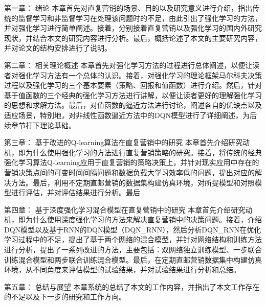 第一章： 绪论 \quad 本章首先对直复营销的场景、目的以及研究意义进行介绍，指出传统的监督学习和非监督学习在处理该问题时的不足，由此引出了强化学习的方法，并对强化学习进行简单阐述。接着，分别接着直复营销以及强化学习的国内外研究现状，并结合本文的研究内容进行分析。最后，概括论述了本文的主要研究内容，并对论文的结构安排进行了说明。

第二章： 相关理论概述 \quad 本章首先对强化学习方法的过程进行总体阐述，以便让读者对强化学习方法有一个总体的认识。接着，对强化学习的理论框架马尔科夫决策过程以及强化学习的三个基本要素（策略、回报和值函数）进行介绍。然后，针对基于值函数的三个经典的强化学习方法进行讲解，以便让读者更好的理解强化学习的思想和求解方法。最后，对值函数的逼近方法进行讨论，阐述各自的优缺点以及适应场景，特别地，对非线性函数逼近方法中的DQN模型进行了详细阐述，为后续章节打下理论基础。

第三章： 基于改进的Q-learning算法在直复营销中的研究 \quad 本章首先介绍研究动机，即为什么使用强化学习的方法进行直复营销策略的研究。接着，将传统的经典强化学习算法Q-learning应用于直复营销的策略决策上，并针对现实应用中存在的营销决策点间的可变时间间隔问题和数据负载大学习效率低的问题，提出对应的解决方法。最后，利用不定期直邮营销的数据集构建仿真环境，对所提模型和对照模型进行评估，并对评估结果进行分析。最后

第四章： 基于深度强化学习混合模型在直复营销中的研究 \quad 本章首先介绍研究动机，即为什么使用深度强化学习的方法来解决直复营销中的决策问题。接着，介绍DQN模型以及基于RNN的DQN模型（DQN_RNN），然后分析DQN_RNN在优化学习过程中的不足，提出了基于两个网络的混合模型，并针对网络结构和训练方法进行分析，提出了一系列改进的方法，主要包括：双网络独立训练模型、一步联合训练混合模型和两步联合训练混合模型。最后，在定期直邮营销数据集中构建仿真环境，从不同角度来评估模型的试验结果，并对试验结果进行分析和总结。

第五章： 总结与展望 \quad 本章系统的总结了本文的工作内容，并指出了本文工作存在的不足以及下一步的研究和工作方向。



